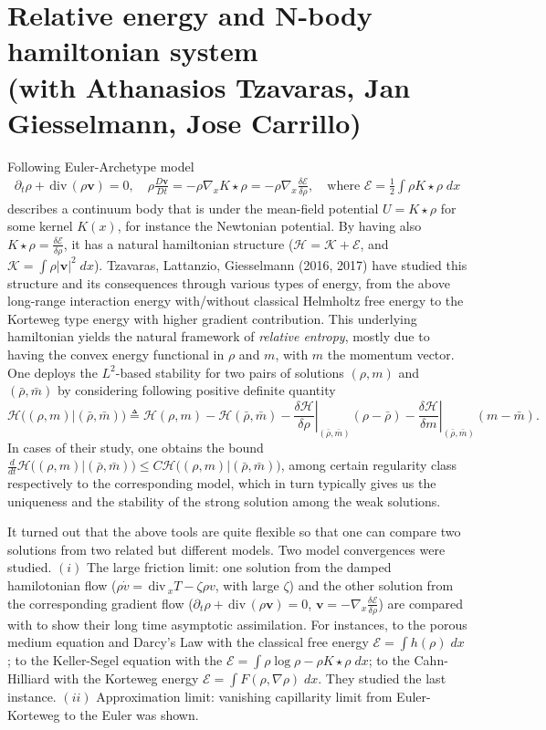 \documentclass[a4paper,11pt]{article}
\def\div{\,\textrm{div}\,}
\def\K{\mathcal{K}}
\def\E{\mathcal{E}}
\def\H{\mathcal{H}}
\begin{document}
\section{Relative energy and N-body hamiltonian system \\{\small (with Athanasios Tzavaras, Jan Giesselmann, Jose Carrillo)}}
Following Euler-Archetype model
\begin{align*}
 \partial_t\rho + \div(\rho \mathbf{v})=0, \quad \rho \frac{D \mathbf{v}}{Dt} = -\rho\nabla_x K\star\rho = -\rho\nabla_x \frac{\delta\E}{\delta\rho}, \quad \text{where $\displaystyle \E = \frac{1}{2}\int \rho K\star\rho \;dx$}
\end{align*}
describes a continuum body that is under the mean-field potential $U=K\star\rho$ for some kernel $K(x)$, for instance the Newtonian potential. By having also $K\star\rho=\frac{\delta\E}{\delta\rho}$, it has a natural hamiltonian structure ($\H = \K+\E$, and $\K = \int \rho |\mathbf{v}|^2 \; dx$). Tzavaras, Lattanzio, Giesselmann (2016, 2017) have studied this structure and its consequences through various types of energy, from the above long-range interaction energy with/without classical Helmholtz free energy to the Korteweg type energy with higher gradient contribution. This underlying hamiltonian yields the natural framework of {\it relative entropy}, mostly due to having the convex energy functional in $\rho$ and $m$, with $m$ the momentum vector. One deploys the $L^2$-based stability for two pairs of solutions $(\rho,m)$ and $(\bar{\rho},\bar{m})$ by considering following positive definite quantity 
$$\H\Big((\rho,m)|(\bar\rho,\bar{m})\Big)\triangleq \H(\rho,m) - \H(\bar\rho,\bar{m}) - \left.\frac{\delta\H}{\delta\rho}\right|_{(\bar\rho,\bar{m})}(\rho-\bar\rho)- \left.\frac{\delta\H}{\delta m}\right|_{(\bar\rho,\bar{m})} (m-\bar{m}).$$
In cases of their study, one obtains the bound
$ \frac{d}{dt} \H\Big((\rho,m)|(\bar\rho,\bar{m})\Big) \le C \H\Big((\rho,m)|(\bar\rho,\bar{m})\Big)$, 
among certain regularity class respectively to the corresponding model, which in turn typically gives us the uniqueness and the stability of the strong solution among the weak solutions.

It turned out that the above tools are quite flexible so that one can compare two solutions from two related but different models. Two model convergences were studied. $(i)$ The large friction limit: one solution from the damped hamilotonian flow ($\displaystyle \rho\dot{v} = \div_x T - \zeta \rho v$, with large $\zeta$) and the other solution from the corresponding gradient flow ($\partial_t\rho +\div(\rho \mathbf{v})=0$, $ \mathbf{v} = -\nabla_x\frac{\delta\E}{\delta\rho}$) are compared with to show their long time asymptotic assimilation. For instances, to the porous medium equation and Darcy's Law with the classical free energy $\E=\int h(\rho)\; dx$; to the Keller-Segel equation with the $\E=\int \rho\log\rho - \rho K\star\rho \; dx$; to the Cahn-Hilliard with the Korteweg energy $\E=\int F(\rho,\nabla\rho)\; dx$. They studied the last instance. $(ii)$ Approximation limit: vanishing capillarity limit from Euler-Korteweg to the Euler was shown.
\end{document}
